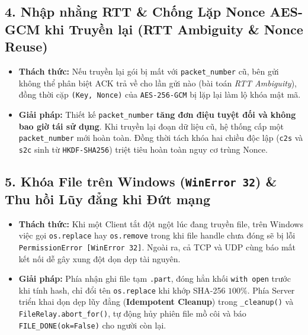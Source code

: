 \subsection{4. Nhập nhằng RTT \& Chống Lặp Nonce AES-GCM khi Truyền lại (RTT Ambiguity \& Nonce Reuse)}
\begin{itemize}
    \item \textbf{Thách thức:} Nếu truyền lại gói bị mất với \texttt{packet\_number} cũ, bên gửi không thể phân biệt ACK trả về cho lần gửi nào (bài toán \textit{RTT Ambiguity}), đồng thời cặp \texttt{(Key, Nonce)} của \texttt{AES-256-GCM} bị lặp lại làm lộ khóa mật mã.
    \item \textbf{Giải pháp:} Thiết kế \texttt{packet\_number} \textbf{tăng đơn điệu tuyệt đối và không bao giờ tái sử dụng}. Khi truyền lại đoạn dữ liệu cũ, hệ thống cấp một \texttt{packet\_number} mới hoàn toàn. Đồng thời tách khóa hai chiều độc lập (\texttt{c2s} và \texttt{s2c} sinh từ \texttt{HKDF-SHA256}) triệt tiêu hoàn toàn nguy cơ trùng Nonce.
\end{itemize}

\subsection{5. Khóa File trên Windows (\texttt{WinError 32}) \& Thu hồi Lũy đẳng khi Đứt mạng}
\begin{itemize}
    \item \textbf{Thách thức:} Khi một Client tắt đột ngột lúc đang truyền file, trên Windows việc gọi \texttt{os.replace} hay \texttt{os.remove} trong khi file handle chưa đóng sẽ bị lỗi \texttt{PermissionError [WinError 32]}. Ngoài ra, cả TCP và UDP cùng báo mất kết nối dễ gây xung đột dọn dẹp tài nguyên.
    \item \textbf{Giải pháp:} Phía nhận ghi file tạm \texttt{.part}, đóng hẳn khối \texttt{with open} trước khi tính hash, chỉ đổi tên \texttt{os.replace} khi khớp SHA-256 $100\%$. Phía Server triển khai dọn dẹp lũy đẳng (\textbf{Idempotent Cleanup}) trong \texttt{\_cleanup()} và \texttt{FileRelay.abort\_for()}, tự động hủy phiên file mồ côi và báo \texttt{FILE\_DONE(ok=False)} cho người còn lại.
\end{itemize}

